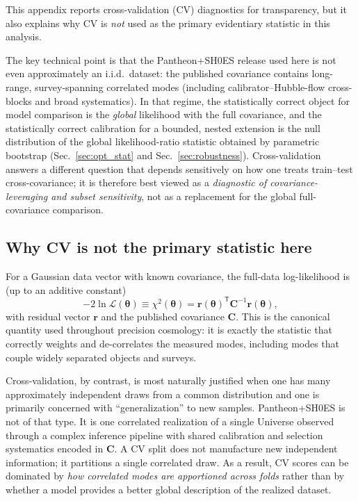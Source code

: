 \documentclass[10pt]{article}
\begin{document}
This appendix reports cross-validation (CV) diagnostics for transparency, but it also explains why
CV is \emph{not} used as the primary evidentiary statistic in this analysis.

The key technical point is that the Pantheon+SH0ES release used here is not even approximately an
i.i.d.\ dataset: the published covariance contains long-range, survey-spanning correlated modes
(including calibrator--Hubble-flow cross-blocks and broad systematics). In that regime, the
statistically correct object for model comparison is the \emph{global} likelihood with the full
covariance, and the statistically correct calibration for a bounded, nested extension is the null
distribution of the global likelihood-ratio statistic obtained by parametric bootstrap
(Sec.~\ref{sec:opt_stat} and Sec.~\ref{sec:robustness}). Cross-validation answers a different
question that depends sensitively on how one treats train--test cross-covariance; it is therefore
best viewed as a \emph{diagnostic of covariance-leveraging and subset sensitivity}, not as a
replacement for the global full-covariance comparison.

\subsection{Why CV is not the primary statistic here}
\label{app:cv:why}

For a Gaussian data vector with known covariance, the full-data log-likelihood is (up to an additive
constant)
\begin{equation}
-2\ln \mathcal{L}(\bm{\theta}) \equiv \chi^2(\bm{\theta})
= \bm{r}(\bm{\theta})^{\mathsf{T}}\bm{C}^{-1}\bm{r}(\bm{\theta}),
\end{equation}
with residual vector $\bm{r}$ and the published covariance $\bm{C}$.
This is the canonical quantity used throughout precision cosmology: it is exactly the statistic
that correctly weights and de-correlates the measured modes, including modes that couple widely
separated objects and surveys.

Cross-validation, by contrast, is most naturally justified when one has many approximately
independent draws from a common distribution and one is primarily concerned with ``generalization''
to new samples.
Pantheon+SH0ES is not of that type. It is one correlated realization of a single Universe observed
through a complex inference pipeline with shared calibration and selection systematics encoded in
$\bm{C}$. A CV split does not manufacture new independent information; it partitions a single
correlated draw.
As a result, CV scores can be dominated by \emph{how correlated modes are apportioned across folds}
rather than by whether a model provides a better global description of the realized dataset.
\end{document}
